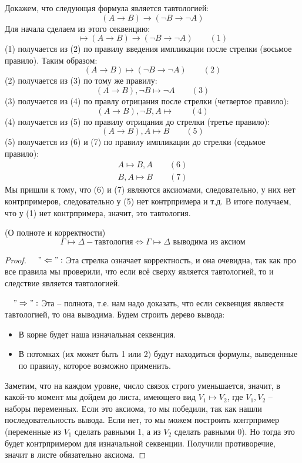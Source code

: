 \begin{example}
    Докажем, что следующая формула является тавтологией: \[ (A \to B) \to (\neg B \to \neg A) \]
    Для начала сделаем из этого секвенцию: \[ \mapsto (A \to B) \to (\neg B \to \neg A) \quad\quad (1) \]
    (1) получается из (2) по правилу введения импликации после стрелки (восьмое правило). Таким образом: \[ (A \to B) \mapsto  (\neg B \to \neg A) \quad\quad (2) \]
    (2) получается из (3) по тому же правилу: \[ (A \to B), \neg B \mapsto  \neg A \quad\quad (3) \]
    (3) получается из (4) по правлу отрицания после стрелки (четвертое правило): \[ (A \to B), \neg B, A \mapsto  \quad\quad (4) \]
    (4) получается из (5) по правилу отрицания до стрелки (третье правило): \[ (A \to B), A \mapsto B \quad\quad (5) \]
    (5) получается из (6) и (7) по правилу импликации до стрелки (седьмое правило): \begin{gather*}
        A \mapsto B, A \quad\quad (6) \\
        B, A \mapsto B \quad\quad (7)
    \end{gather*}
    Мы пришли к тому, что (6) и (7) являются аксиомами, следовательно, у них нет контрпримеров, следовательно у (5) нет контрпримера и т.д. В итоге получаем, что у (1) нет контрпримера, значит, это тавтология.

    \begin{theorem}
        (О полноте и корректности) \[ \Gamma \mapsto \Delta - \text{тавтология} \Longleftrightarrow \Gamma \mapsto \Delta \text{ выводима из аксиом} \]
    \end{theorem}
    \begin{proof}
        \quad

        $\quad "\Leftarrow":$ Эта стрелка означает корректность, и она очевидна, так как про все правила мы проверили, что если всё сверху является тавтологией, то и следствие является тавтологией.

        $\quad "\Rightarrow":$ Эта -- полнота, т.е. нам надо доказать, что если секвенция являестя тавтологией, то она выводима.
        Будем строить дерево вывода: \begin{itemize}
            \item В корне будет наша изначальная секвенция.
            \item В потомках (их может быть 1 или 2) будут находиться формулы, выведенные по правилу, которое возможно применить.
        \end{itemize}
        \quad Заметим, что на каждом уровне, число связок строго уменьшается, значит, в какой-то момент мы дойдем до листа, имеющего вид $V_1 \mapsto V_2$, где $V_1, V_2$ -- наборы переменных. Если это аксиома, то мы победили, так как нашли последовательность вывода. Если нет, то мы можем построить контрпример (переменные из $V_1$ сделать равными 1, а из $V_2$ сделать равными 0). Но тогда это будет контрпримером для изначальной секвенции. Получили противоречие, значит в листе обязательно аксиома.
    \end{proof}
\end{example}

